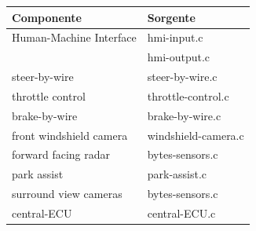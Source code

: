\documentclass[11pt, openany]{article}
\theoremstyle{definition}
\theoremstyle{plain}
\theoremstyle{remark}
\begin{document}
	\begin{tcolorbox}[width=\textwidth,colback={Cornsilk2}]\label{tab:sorgenti}
		\begin{tabularx}{\textwidth}{p{8cm}  l}
			\textbf{Componente}			&	\textbf{Sorgente}	\\\toprule
			Human-Machine Interface 	& 	hmi-input.c			\\
			&	hmi-output.c		\\\midrule
			steer-by-wire				&	steer-by-wire.c		\\\midrule
			throttle control			&	throttle-control.c	\\\midrule
			brake-by-wire				&	brake-by-wire.c		\\\midrule
			front windshield camera		&	windshield-camera.c	\\\midrule
			forward facing radar		&	bytes-sensors.c		\\\midrule
			park assist					&	park-assist.c		\\\midrule
			surround view cameras		&	bytes-sensors.c		\\\midrule
			central-ECU					&	central-ECU.c
		\end{tabularx}
	\end{tcolorbox}
	
\end{document}
